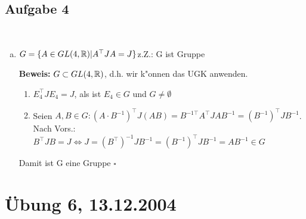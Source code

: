\documentclass[a4paper,twoside,DIV15,BCOR12mm]{scrbook}
\newcommand{\enue}{\ \begin{enumerate}[(1)]}
\newcommand{\enua}{\ \begin{enumerate}[a)]}
\newcommand{\une}{\end{enumerate}}
\newcommand{\LRA}{\Leftrightarrow}
\newcommand{\x}{\cdot}
\newcommand{\trans}{^\top}
\newenvironment{bew}{\pagebreak[2]\textbf{Beweis: }}{\qed}
\renewcommand{\qed}{\hspace*{\fill} \ensuremath{\square}}
\begin{document}
\subsection{Aufgabe 4}
\enua
\item $G=\{A\in GL(4,\MdR)| A\trans JA=J\}$\quad z.Z.: G ist Gruppe\par
\begin{bew}$G\subset GL(4,\mathbb{R})$, d.h. wir k"onnen das UGK anwenden.
\enue
\item $E_4\trans JE_4=J$, als ist $E_4\in G$ und $G\ne\emptyset$
\item Seien $A,B\in G: (A\x B^{-1})\trans J(AB)=B^{-1\top}A\trans JAB^{-1}=(B^{-1})\trans JB^{-1}$. Nach Vors.: $B\trans JB=J\LRA J={(B\trans)}^{-1}JB^{-1}={(B^{-1})}\trans JB^{-1}=AB^{-1}\in G$
\une
Damit ist G eine Gruppe
\end{bew}
\une
\section {Übung 6, 13.12.2004}
\end{document}
